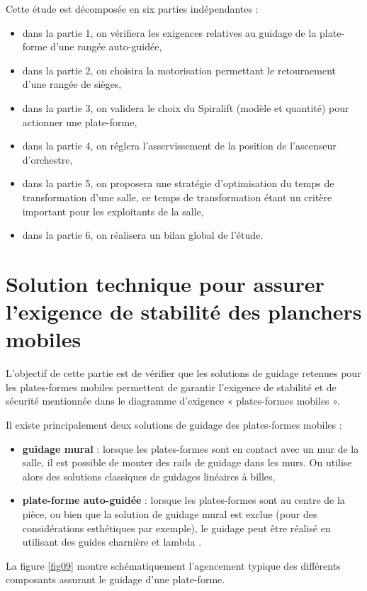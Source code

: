 \newpage

Cette étude est décomposée en six parties indépendantes :
\begin{itemize}
 \item dans la partie 1, on vérifiera les exigences relatives au guidage de la plate-forme d'une
rangée auto-guidée,
 \item dans la partie 2, on choisira la motorisation permettant le retournement d'une rangée de
sièges,
 \item dans la partie 3, on validera le choix du Spiralift (modèle et quantité) pour actionner une
plate-forme,
 \item dans la partie 4, on réglera l'asservissement de la position de l'ascenseur d'orchestre,
 \item dans la partie 5, on proposera une stratégie d'optimisation du temps de transformation d'une
salle, ce temps de transformation étant un critère important pour les exploitants de la salle,
 \item dans la partie 6, on réalisera un bilan global de l'étude.
\end{itemize}

\section{Solution technique pour assurer l'exigence de stabilité des planchers mobiles}

L'objectif de cette partie est de vérifier que les solutions de guidage retenues pour les plates-formes
mobiles permettent de garantir l'exigence de stabilité et de sécurité mentionnée dans le diagramme
d'exigence « plates-formes mobiles ».

Il existe principalement deux solutions de guidage des plates-formes mobiles :
\begin{itemize}
 \item \textbf{guidage mural} : lorsque les plates-formes sont en contact avec un mur de la salle, il est
possible de monter des rails de guidage dans les murs. On utilise alors des solutions
classiques de guidages linéaires à billes,
 \item \textbf{plate-forme auto-guidée} : lorsque les plates-formes sont au centre de la pièce, ou bien que
la solution de guidage mural est exclue (pour des considérations esthétiques par exemple), le
guidage peut être réalisé en utilisant des guides \og charnière \fg et \og lambda \fg.
\end{itemize}

La figure \ref{fig09} montre schématiquement l'agencement typique des différents composants assurant le guidage d'une plate-forme.

